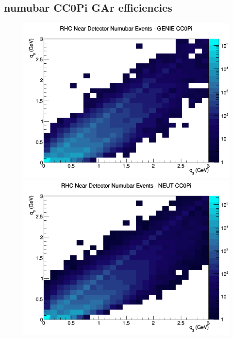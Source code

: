 \documentclass[12pt]{article}
\begin{document}
\subsection{numubar CC0Pi GAr efficiencies}
\begin{figure}[h]
\includegraphics[width=\linewidth]{eff_q0_q3/GAr/CC0Pi_RHC_ND_numubar_q3_q0_GENIE.png}
\endminipage
{}
\includegraphics[width=\linewidth]{eff_q0_q3/GAr/CC0Pi_RHC_ND_numubar_q3_q0_NEUT.png}
\endminipage
{}

\end{figure}
\end{document}

